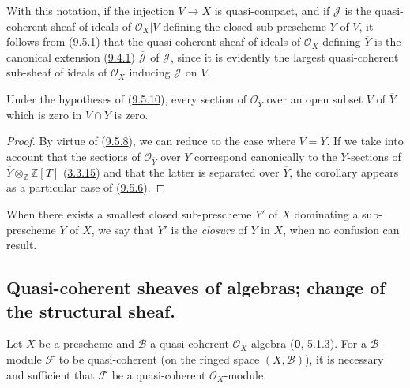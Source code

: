 With this notation, if the injection $V\to X$ is quasi-compact, and if
$\mathscr{J}$ is the quasi-coherent sheaf of ideals of
$\mathscr{O}_X|V$ defining the closed sub-prescheme $Y$ of $V$, it follows
from (\hyperref[I.9.5.1]{9.5.1}) that the quasi-coherent sheaf of ideals
of $\mathscr{O}_X$ defining $\overline{Y}$ is the canonical extension
(\hyperref[I.9.4.1]{9.4.1}) $\overline{\mathscr{J}}$ of $\mathscr{J}$,
since it is evidently the largest quasi-coherent sub-sheaf of ideals of
$\mathscr{O}_X$ inducing $\mathscr{J}$ on $V$.
\begin{corollary}[9.5.11]
\label{I.9.5.11}
Under the hypotheses of \textup{(\hyperref[I.9.5.10]{9.5.10})}, every section of
$\mathscr{O}_{\overline{Y}}$ over an open subset $V$ of $\overline{Y}$
which is zero in $V\cap Y$ is zero.
\end{corollary}

\begin{proof}
By virtue of (\hyperref[I.9.5.8]{9.5.8}), we can reduce to the case where
$V=\overline{Y}$. If we take into account that the sections of
$\mathscr{O}_{\overline{Y}}$ over $\overline{Y}$ correspond
canonically to the $\overline{Y}$-sections of
$\overline{Y}\otimes_{\mathbb{Z}}\mathbb{Z}[T]$
(\hyperref[I.3.3.15]{3.3.15}) and that the latter is separated over
$\overline{Y}$, the corollary appears as a particular case of
(\hyperref[I.9.5.6]{9.5.6}).
\end{proof}

When there exists a smallest closed sub-prescheme $Y'$ of $X$
dominating a sub-prescheme $Y$ of $X$, we say that $Y'$ is the
\emph{closure} of $Y$ in $X$, when no confusion can result.

\subsection{Quasi-coherent sheaves of algebras; change of the structural
sheaf.}
\label{subsection:I.9.6}

\begin{proposition}[9.6.1]
\label{I.9.6.1}
Let $X$ be a prescheme and $\mathscr{B}$ a quasi-coherent
$\mathscr{O}_X$-algebra \textup{(\hyperref[0.5.1.3]{\textbf{0}, 5.1.3})}. For a
$\mathscr{B}$-module $\mathscr{F}$ to be quasi-coherent (on the ringed
space $(X,\mathscr{B})$), it is necessary and sufficient that $\mathscr{F}$
be a quasi-coherent $\mathscr{O}_X$-module.
\end{proposition}

